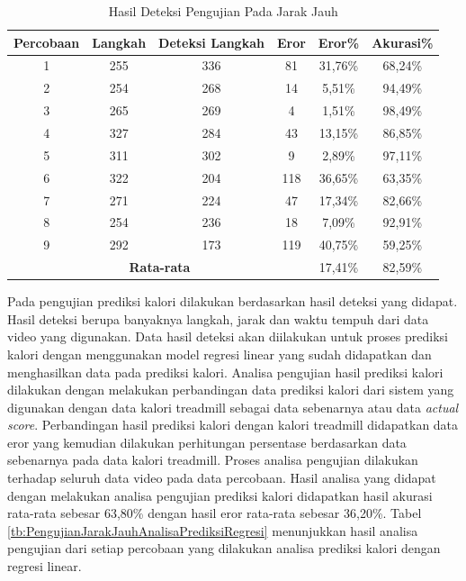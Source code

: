 \begin{longtable}{|c|c|c|c|c|c|}
  \caption{Hasil Deteksi Pengujian Pada Jarak Jauh}
  \label{tb:PengujianJarakJauhAnalisaDeteksi}                                   \\
  \hline
  \rowcolor[HTML]{C0C0C0}
  \textbf{Percobaan} & \textbf{Langkah} & \textbf{Deteksi Langkah} & \textbf{Eror} & \textbf{Eror\%} & \textbf{Akurasi\%} \\
  \hline
  1   & 255   & 336 & 81   & 31,76\%    & 68,24\%   \\
  \hline
  2   & 254   & 268 & 14   & 5,51\%     & 94,49\%   \\
  \hline
  3   & 265   & 269 & 4    & 1,51\%     & 98,49\%     \\
  \hline
  4   & 327   & 284 & 43   & 13,15\%    & 86,85\%   \\
  \hline
  5   & 311   & 302 & 9    & 2,89\%     & 97,11\%   \\
  \hline
  6   & 322   & 204 & 118  & 36,65\%    & 63,35\%   \\
  \hline
  7   & 271   & 224 & 47   & 17,34\%    & 82,66\%   \\
  \hline
  8   & 254   & 236 & 18   & 7,09\%     & 92,91\%   \\
  \hline
  9   & 292   & 173 & 119  & 40,75\%   & 59,25\%   \\
  \hline

  \multicolumn{4}{|c|}{\textbf{Rata-rata}} & 17,41\% & 82,59\% \\
  \hline
\end{longtable}
\clearpage

Pada pengujian prediksi kalori dilakukan berdasarkan hasil deteksi yang didapat. Hasil deteksi berupa banyaknya langkah, jarak dan waktu tempuh dari data video yang digunakan. Data hasil deteksi akan diilakukan untuk proses prediksi kalori dengan menggunakan model regresi linear yang sudah didapatkan dan menghasilkan data pada prediksi kalori. Analisa pengujian hasil prediksi kalori dilakukan dengan melakukan perbandingan data prediksi kalori dari sistem yang digunakan dengan data kalori treadmill sebagai data sebenarnya atau data \emph{actual score}. Perbandingan hasil prediksi kalori dengan kalori treadmill didapatkan data eror yang kemudian dilakukan perhitungan persentase berdasarkan data sebenarnya pada data kalori treadmill. Proses analisa pengujian dilakukan terhadap seluruh data video pada data percobaan. Hasil analisa yang didapat dengan melakukan analisa pengujian prediksi kalori didapatkan hasil akurasi rata-rata sebesar 63,80\% dengan hasil eror rata-rata sebesar 36,20\%. Tabel \ref{tb:PengujianJarakJauhAnalisaPrediksiRegresi} menunjukkan hasil analisa pengujian dari setiap percobaan yang dilakukan analisa prediksi kalori dengan regresi linear.

